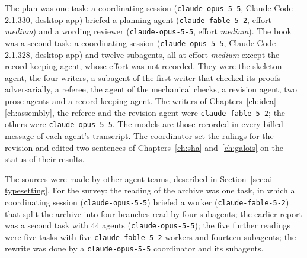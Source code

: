\documentclass[11pt]{amsbook}
\theoremstyle{plain}
\theoremstyle{definition}
\theoremstyle{remark}
\numberwithin{equation}{section}
\numberwithin{figure}{chapter}
\numberwithin{table}{chapter}
\begin{document}
The plan was one task: a coordinating session (\texttt{claude-opus-5-5},
Claude Code 2.1.330, desktop app) briefed a planning agent
(\texttt{claude-fable-5-2}, effort \emph{medium}) and a wording
reviewer (\texttt{claude-opus-5-5}, effort \emph{medium}). The book was
a second task: a coordinating session (\texttt{claude-opus-5-5}, Claude
Code 2.1.328, desktop app) and twelve subagents, all at effort
\emph{medium} except the record-keeping agent, whose effort was not
recorded. They were the skeleton agent, the four writers, a subagent
of the first writer that checked its proofs adversarially, a referee, the
agent of the mechanical checks, a revision agent, two prose agents and
a record-keeping agent. The writers of
Chapters~\ref{ch:idea}--\ref{ch:assembly}, the referee and the
revision agent were \texttt{claude-fable-5-2}; the others were
\texttt{claude-opus-5-5}. The models are those recorded in every
billed message of each agent's transcript. The coordinator set the
rulings for the revision and edited two sentences of
Chapters~\ref{ch:sha} and~\ref{ch:galois} on the status of their
results.

The sources were made by other agent teams, described in
Section~\ref{sec:ai-typesetting}. For the survey: the reading of the
archive was one task, in which a coordinating session
(\texttt{claude-opus-5-5}) briefed a worker (\texttt{claude-fable-5-2})
that split the archive into four branches read by four subagents; the
earlier report was a second task with $44$ agents
(\texttt{claude-opus-5-5}); the five further readings were five tasks
with five \texttt{claude-fable-5-2} workers and fourteen subagents;
the rewrite was done by a \texttt{claude-opus-5-5} coordinator and
its subagents.
\end{document}
